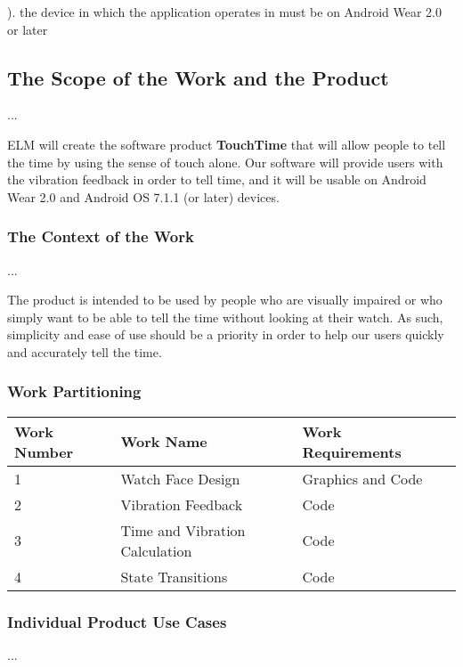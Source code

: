 \documentclass[12pt, titlepage]{article}
\begin{document}
). the device in which the application operates in must be on Android Wear 2.0 or later %
\subsection{The Scope of the Work and the Product}
... %

ELM will create the software product \textbf{TouchTime} that will allow people to tell the time by using the sense of touch alone. Our software will provide users with the vibration feedback in order to tell time, and it will be usable on Android Wear 2.0 and Android OS 7.1.1 (or later) devices. %

\subsubsection{The Context of the Work}
... %

The product is intended to be used by people who are visually impaired or who simply want to be able to tell the time without looking at their watch. As such, simplicity and ease of use should be a priority in order to help our users quickly and accurately tell the time.

\subsubsection{Work Partitioning}

\begin{center}
    \begin{tabular}{| l | l | l | p{5cm} | }
    \hline
    Work Number & Work Name & Work Requirements \\ \hline
    1 & Watch Face Design & Graphics and Code \\ \hline
    2 & Vibration Feedback & Code \\ \hline
    3 & Time and Vibration Calculation & Code \\ \hline
    4 & State Transitions & Code \\ \hline
    \end{tabular}
\end{center}

\subsubsection{Individual Product Use Cases}
... %
\end{document}

